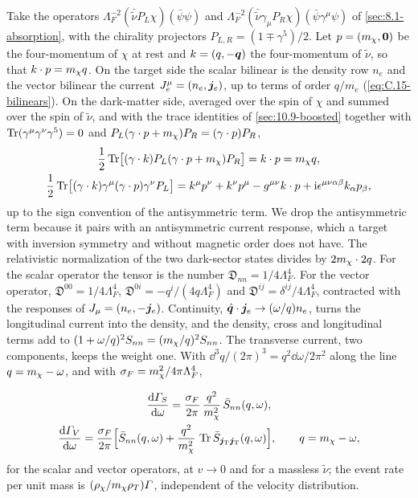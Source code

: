 Take the operators $\Lambda_F^{-2}(\bar{\tilde\nu}P_L\chi)(\bar\psi\psi)$ and $\Lambda_F^{-2}(\bar{\tilde\nu}\gamma_\mu P_R\chi)(\bar\psi\gamma^\mu\psi)$ of \cref{sec:8.1-absorption}, with the chirality projectors $P_{L,R} = (1 \mp \gamma^5)/2$. Let $p = (m_{\chi}, \bm{0})$ be the four-momentum of $\chi$ at rest and $k = (q, -\bm{q})$ the four-momentum of $\tilde\nu$, so that $k\cdot p = m_{\chi} q$. On the target side the scalar bilinear is the density row $n_e$ and the vector bilinear the current $J^\mu_e = (n_e, \bm{j}_e)$, up to terms of order $q/m_e$ (\cref{eq:C.15-bilinears}). On the dark-matter side, averaged over the spin of $\chi$ and summed over the spin of $\tilde\nu$, and with the trace identities of \cref{sec:10.9-boosted} together with $\operatorname{Tr}(\gamma^\mu\gamma^\nu\gamma^5) = 0$ and $P_L(\gamma\cdot p + m_{\chi})P_R = (\gamma\cdot p)P_R$,
\begin{gather*}
  \frac12\operatorname{Tr}\bigl[(\gamma\cdot k)P_L(\gamma\cdot p + m_{\chi})P_R\bigr] = k\cdot p = m_{\chi} q , \\
  \frac12\operatorname{Tr}\bigl[(\gamma\cdot k)\gamma^\mu(\gamma\cdot p)\gamma^\nu P_L\bigr] = k^\mu p^\nu + k^\nu p^\mu - g^{\mu\nu}k\cdot p + \mathrm{i}\epsilon^{\mu\nu\alpha\beta}k_\alpha p_\beta ,
\end{gather*}
up to the sign convention of the antisymmetric term. We drop the antisymmetric term because it pairs with an antisymmetric current response, which a target with inversion symmetry and without magnetic order does not have. The relativistic normalization of the two dark-sector states divides by $2m_{\chi}\cdot2q$. For the scalar operator the tensor is the number $\mathfrak{D}_{nn} = 1/4\Lambda_F^4$. For the vector operator, $\mathfrak{D}^{00} = 1/4\Lambda_F^4$, $\mathfrak{D}^{0i} = -q^i/(4q\Lambda_F^4)$ and $\mathfrak{D}^{ij} = \delta^{ij}/4\Lambda_F^4$, contracted with the responses of $J_\mu = (n_e, -\bm{j}_e)$. Continuity, $\hat{\bm{q}}\cdot\bm{j}_e \to (\omega/q)n_e$, turns the longitudinal current into the density, and the density, cross and longitudinal terms add to $(1 + \omega/q)^2S_{nn} = (m_{\chi}/q)^2S_{nn}$. The transverse current, two components, keeps the weight one. With $\dd^3q/(2\pi)^3 = q^2\dd\omega/2\pi^2$ along the line $q = m_{\chi} - \omega$, and with $\sigma_F = m_{\chi}^2/4\pi\Lambda_F^4$,
\begin{keyresult}
\begin{equation}
  \begin{gathered}
  \frac{\mathrm{d}\varGamma_S}{\mathrm{d}\omega} = \frac{\sigma_F}{2\pi}\,\frac{q^2}{m_{\chi}^2}\,\bar S_{nn}(q,\omega) , \\
  \frac{\mathrm{d}\varGamma_V}{\mathrm{d}\omega} = \frac{\sigma_F}{2\pi}\Bigl[\bar S_{nn}(q,\omega) + \frac{q^2}{m_{\chi}^2}\,\operatorname{Tr}\bar S_{\bm{j}_{\mathrm{T}}\bm{j}_{\mathrm{T}}}(q,\omega)\Bigr] , \qquad q = m_{\chi} - \omega ,
  \end{gathered}
  \label{eq:10.9-ferm}
\end{equation}
for the scalar and vector operators, at $v \to 0$ and for a massless $\tilde\nu$; the event rate per unit mass is $(\rho_\chi/m_{\chi}\rho_T)\varGamma$, independent of the velocity distribution.
\end{keyresult}
